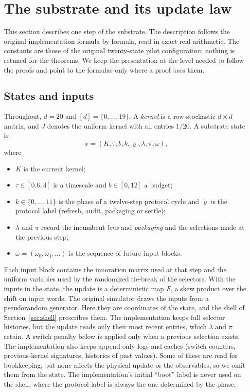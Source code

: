 \section{The substrate and its update law}\label{sec:substrate}

This section describes one step of the substrate. The description follows the original implementation formula by formula, read in exact real arithmetic. The constants are those of the original twenty-state pilot configuration; nothing is retuned for the theorems. We keep the presentation at the level needed to follow the proofs and point to the formulas only where a proof uses them.

\subsection{States and inputs}

Throughout, $d=20$ and $[d]=\{0,\dots,19\}$. A \emph{kernel} is a row-stochastic $d\times d$ matrix, and $J$ denotes the uniform kernel with all entries $1/20$. A substrate state is
\[
x=(K,\tau,b,k,\varrho,\lambda,\pi,\omega),
\]
where
\begin{itemize}
  \item $K$ is the current kernel;
  \item $\tau\in[0.6,4]$ is a timescale and $b\in[0,12]$ a budget;
  \item $k\in\{0,\dots,11\}$ is the phase of a twelve-step protocol cycle and $\varrho$ is the protocol label (refresh, audit, packaging or settle);
  \item $\lambda$ and $\pi$ record the incumbent \emph{lens} and \emph{packaging} and the selections made at the previous step;
  \item $\omega=(\omega_0,\omega_1,\dots)$ is the sequence of future input blocks.
\end{itemize}
Each input block contains the innovation matrix used at that step and the uniform variables used by the randomized tie-break of the selectors. With the inputs in the state, the update is a deterministic map $F$, a skew product over the shift on input words. The original simulator draws the inputs from a pseudorandom generator. Here they are coordinates of the state, and the shell of Section~\ref{sec:shell} prescribes them. The implementation keeps full selector histories, but the update reads only their most recent entries, which $\lambda$ and $\pi$ retain. A switch penalty below is applied only when a previous selection exists. The implementation also keeps append-only logs and caches (switch counters, previous-kernel signatures, histories of past values). Some of these are read for bookkeeping, but none affects the physical update or the observables, so we omit them from the state. The implementation's initial ``boot'' label is never used on the shell, where the protocol label is always the one determined by the phase.

